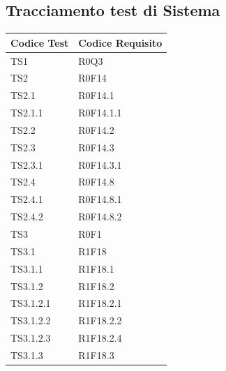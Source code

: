 \documentclass[../PianoDiQualifica.tex]{subfiles}
\begin{document}
	\subsection{Tracciamento test di Sistema}
	\begin{longtabu} to \textwidth {
			X[4,l,p]
			X[8,l,p]}
		\toprule
		 Codice Test & Codice Requisito   \\
		\midrule
		\endhead
		\midrule
		\addlinespace[0.2em]
		TS1 & R0Q3  \\
		\addlinespace[0.2em]
		\midrule
		\addlinespace[0.2em]
		TS2 & R0F14  \\
		\addlinespace[0.2em]
		\midrule
		\addlinespace[0.2em]
		TS2.1 & R0F14.1   \\
		\addlinespace[0.2em]
		\midrule
		\addlinespace[0.2em]
		TS2.1.1 & R0F14.1.1   \\
		\addlinespace[0.2em]
		\midrule
		\addlinespace[0.2em]
		TS2.2 & R0F14.2   \\
		\addlinespace[0.2em]
		\midrule
		\addlinespace[0.2em]
		TS2.3 & R0F14.3   \\
		\addlinespace[0.2em]
		\midrule
		\addlinespace[0.2em]
		TS2.3.1 & R0F14.3.1   \\
		\addlinespace[0.2em]
		\midrule
		\addlinespace[0.2em]
		TS2.4 & R0F14.8   \\
		\addlinespace[0.2em]
		\midrule
		\addlinespace[0.2em]
		TS2.4.1 & R0F14.8.1   \\
		\addlinespace[0.2em]
		\midrule
		\addlinespace[0.2em]
		TS2.4.2 & R0F14.8.2   \\
		\addlinespace[0.2em]
		\midrule
		\addlinespace[0.2em]
		TS3 & R0F1   \\
		\addlinespace[0.2em]
		\midrule
		\addlinespace[0.2em]
		TS3.1 & R1F18   \\
		\addlinespace[0.2em]
		\midrule
		\addlinespace[0.2em]
		TS3.1.1 & R1F18.1   \\
		\addlinespace[0.2em]
		\midrule
		\addlinespace[0.2em]
		TS3.1.2 & R1F18.2   \\
		\addlinespace[0.2em]
		\midrule
		\addlinespace[0.2em]
		TS3.1.2.1 & R1F18.2.1   \\
		\addlinespace[0.2em]
		\midrule
		\addlinespace[0.2em]
		TS3.1.2.2 & R1F18.2.2   \\
		\addlinespace[0.2em]
		\midrule
		\addlinespace[0.2em]
		TS3.1.2.3 & R1F18.2.4   \\
		\addlinespace[0.2em]
		\midrule
		\addlinespace[0.2em]
		TS3.1.3 & R1F18.3   \\

\end{longtabu}
\end{document}
